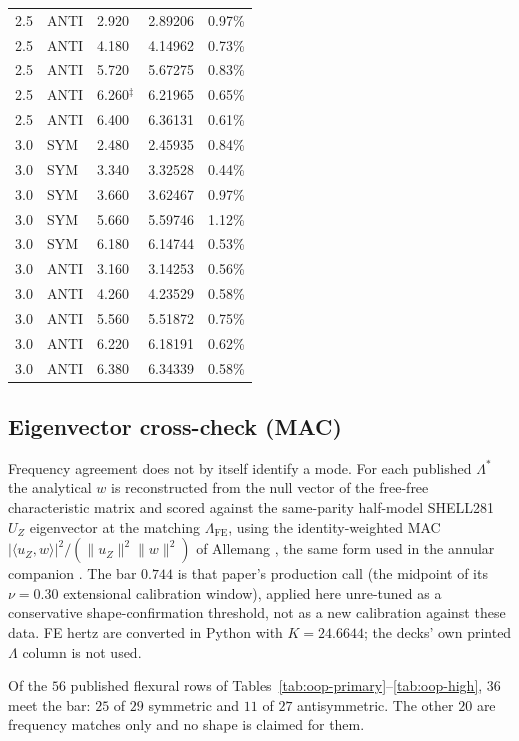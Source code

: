 \documentclass[11pt]{article}
\begin{document}
\begin{table}[!htbp]
\begin{minipage}[t]{0.49\textwidth}
\begin{tabular}{@{}rllrr@{}}
\midrule
2.5 & ANTI & 2.920 & 2.89206 & 0.97\% \\
2.5 & ANTI & 4.180 & 4.14962 & 0.73\% \\
2.5 & ANTI & 5.720 & 5.67275 & 0.83\% \\
2.5 & ANTI & 6.260$^\ddagger$ & 6.21965 & 0.65\% \\
2.5 & ANTI & 6.400 & 6.36131 & 0.61\% \\
3.0 & SYM  & 2.480 & 2.45935 & 0.84\% \\
3.0 & SYM  & 3.340 & 3.32528 & 0.44\% \\
3.0 & SYM  & 3.660 & 3.62467 & 0.97\% \\
3.0 & SYM  & 5.660 & 5.59746 & 1.12\% \\
3.0 & SYM  & 6.180 & 6.14744 & 0.53\% \\
3.0 & ANTI & 3.160 & 3.14253 & 0.56\% \\
3.0 & ANTI & 4.260 & 4.23529 & 0.58\% \\
3.0 & ANTI & 5.560 & 5.51872 & 0.75\% \\
3.0 & ANTI & 6.220 & 6.18191 & 0.62\% \\
3.0 & ANTI & 6.380 & 6.34339 & 0.58\% \\
\bottomrule
\end{tabular}
\end{minipage}
\end{table}
\FloatBarrier

\subsection{Eigenvector cross-check (MAC)}\label{sec:oop-mac}
Frequency agreement does not by itself identify a mode. For each
published $\Lambda^{*}$ the analytical $w$ is reconstructed from the
null vector of the free-free characteristic matrix and scored against
the same-parity half-model SHELL281 $U_Z$ eigenvector at the matching
$\Lambda_{\mathrm{FE}}$, using the identity-weighted MAC
$|\langle u_Z,w\rangle|^2/(\|u_Z\|^2\|w\|^2)$ of Allemang
\cite{allemang2003}, the same form used in the annular companion
\cite{mccune2026annular}. The bar $0.744$ is that paper's production
call (the midpoint of its $\nu=0.30$ extensional calibration window),
applied here unre-tuned as a conservative shape-confirmation threshold,
not as a new calibration against these data. FE
hertz are converted in Python with $K=24.6644$; the decks' own printed
$\Lambda$ column is not used.

Of the $56$ published flexural rows of
Tables~\ref{tab:oop-primary}--\ref{tab:oop-high}, $36$ meet the bar:
$25$ of $29$ symmetric and $11$ of $27$ antisymmetric. The other $20$ are
frequency matches only and no shape is claimed for them.
\end{document}

